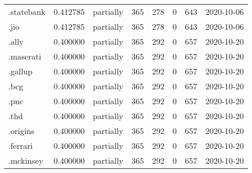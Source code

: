 \begin{tabular}{lrlrrrrl}
.statebank                &          0.412785 &       partially &                         365 &                         278 &                           0 &                 643 &           2020-10-06 \\
.jio                      &          0.412785 &       partially &                         365 &                         278 &                           0 &                 643 &           2020-10-06 \\
.ally                     &          0.400000 &       partially &                         365 &                         292 &                           0 &                 657 &           2020-10-20 \\
.maserati                 &          0.400000 &       partially &                         365 &                         292 &                           0 &                 657 &           2020-10-20 \\
.gallup                   &          0.400000 &       partially &                         365 &                         292 &                           0 &                 657 &           2020-10-20 \\
.bcg                      &          0.400000 &       partially &                         365 &                         292 &                           0 &                 657 &           2020-10-20 \\
.pnc                      &          0.400000 &       partially &                         365 &                         292 &                           0 &                 657 &           2020-10-20 \\
.thd                      &          0.400000 &       partially &                         365 &                         292 &                           0 &                 657 &           2020-10-20 \\
.origins                  &          0.400000 &       partially &                         365 &                         292 &                           0 &                 657 &           2020-10-20 \\
.ferrari                  &          0.400000 &       partially &                         365 &                         292 &                           0 &                 657 &           2020-10-20 \\
.mckinsey                 &          0.400000 &       partially &                         365 &                         292 &                           0 &                 657 &           2020-10-20 \\

\end{tabular}
